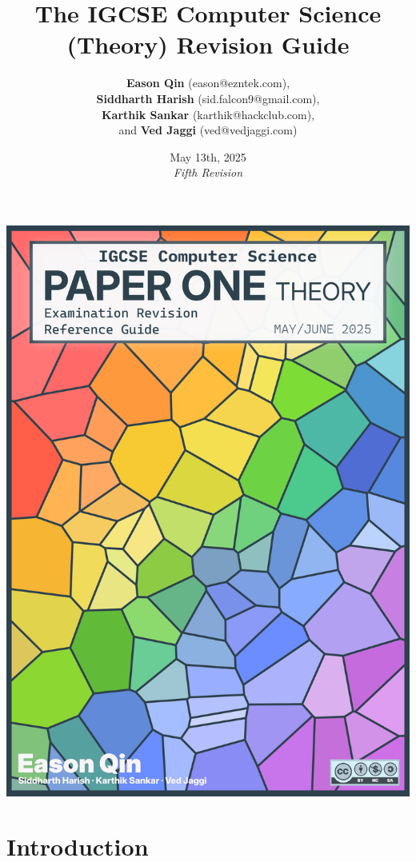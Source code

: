 \documentclass[a4paper, oneside, 11pt]{book} %
\title{The IGCSE Computer Science (Theory) Revision Guide}
\author{\textbf{Eason Qin} (eason@ezntek.com),\\\textbf{Siddharth Harish} (sid.falcon9@gmail.com),\\\textbf{Karthik Sankar} (karthik@hackclub.com),\\and \textbf{Ved Jaggi} (ved@vedjaggi.com)}
\date{May 13th, 2025\\\emph{Fifth Revision}}
\begin{document}

\clearpage
\thispagestyle{empty}
\noindent
\includegraphics[width=\paperwidth,height=\paperheight,keepaspectratio=false]{cover.png}
\clearpage
\restoregeometry

\maketitle
\label{table-of-contents}
\tableofcontents

\chapter*{Introduction}
\label{introduction}

\end{document}
